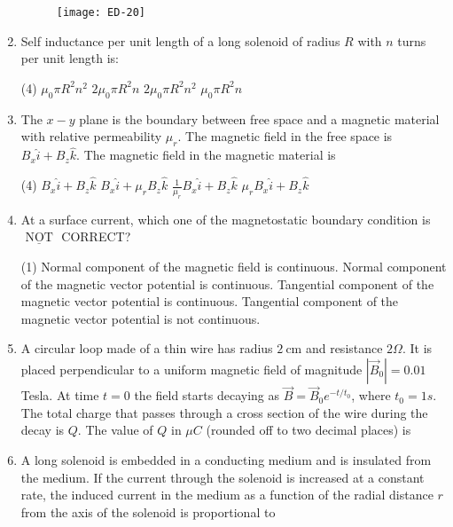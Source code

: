\begin{enumerate}
		{}
	\begin{figure}[H]
		\centering
		\texttt{[image: ED-20]}
	\end{figure}
\item Self inductance per unit length of a long solenoid of radius $R$ with $n$ turns per unit length is:
	{}
 \begin{tasks}(4)
	\task[\textbf{a.}]$\mu_{0} \pi R^{2} n^{2}$
	\task[\textbf{b.}]$2 \mu_{0} \pi R^{2} n$
	\task[\textbf{c.}]$2 \mu_{0} \pi R^{2} n^{2}$
	\task[\textbf{d.}] $\mu_{0} \pi R^{2} n$
\end{tasks}	
\item The $x-y$ plane is the boundary between free space and a magnetic material with relative permeability $\mu_{r}$. The magnetic field in the free space is $B_{x} \hat{i}+B_{z} \hat{k}$. The magnetic field in the magnetic material is
	{}
 \begin{tasks}(4)
	\task[\textbf{a.}]$B_{x} \hat{i}+B_{z} \hat{k}$
	\task[\textbf{b.}]$B_{x} \hat{i}+\mu_{r} B_{z} \hat{k}$
	\task[\textbf{c.}] $\frac{1}{\mu_{r}} B_{x} \hat{i}+B_{z} \hat{k}$
	\task[\textbf{d.}] $\mu_{r} B_{x} \hat{i}+B_{z} \hat{k}$
\end{tasks}	
\item 	At a surface current, which one of the magnetostatic boundary condition is $\underline{\text { NOT }}$ CORRECT?
{}
	 \begin{tasks}(1)
		\task[\textbf{a.}]Normal component of the magnetic field is continuous.
		\task[\textbf{b.}]Normal component of the magnetic vector potential is continuous.
		\task[\textbf{c.}] Tangential component of the magnetic vector potential is continuous.
		\task[\textbf{d.}] Tangential component of the magnetic vector potential is not continuous.
	\end{tasks}
\item A circular loop made of a thin wire has radius $2 \mathrm{~cm}$ and resistance $2 \Omega$. It is placed perpendicular to a uniform magnetic field of magnitude $\left|\vec{B}_{0}\right|=0.01$ Tesla. At time $t=0$ the field starts decaying as $\vec{B}=\vec{B}_{0} e^{-t / t_{0}}$, where $t_{0}=1 s$. The total charge that passes through a cross section of the wire during the decay is $Q$. The value of $Q$ in $\mu C$ (rounded off to two decimal places) is
{}
\item A long solenoid is embedded in a conducting medium and is insulated from the medium. If the current through the solenoid is increased at a constant rate, the induced current in the medium as a function of the radial distance $r$ from the axis of the solenoid is proportional to

\end{enumerate}
